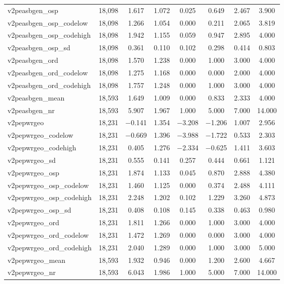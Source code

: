 \begin{table}[!htbp]
\begin{tabular}{@{\extracolsep{5pt}}lccccccc}
v2peasbgen\_osp & 18,098 & 1.617 & 1.072 & 0.025 & 0.649 & 2.467 & 3.900 \\ 
v2peasbgen\_osp\_codelow & 18,098 & 1.266 & 1.054 & 0.000 & 0.211 & 2.065 & 3.819 \\ 
v2peasbgen\_osp\_codehigh & 18,098 & 1.942 & 1.155 & 0.059 & 0.947 & 2.895 & 4.000 \\ 
v2peasbgen\_osp\_sd & 18,098 & 0.361 & 0.110 & 0.102 & 0.298 & 0.414 & 0.803 \\ 
v2peasbgen\_ord & 18,098 & 1.570 & 1.238 & 0.000 & 1.000 & 3.000 & 4.000 \\ 
v2peasbgen\_ord\_codelow & 18,098 & 1.275 & 1.168 & 0.000 & 0.000 & 2.000 & 4.000 \\ 
v2peasbgen\_ord\_codehigh & 18,098 & 1.757 & 1.248 & 0.000 & 1.000 & 3.000 & 4.000 \\ 
v2peasbgen\_mean & 18,593 & 1.649 & 1.009 & 0.000 & 0.833 & 2.333 & 4.000 \\ 
v2peasbgen\_nr & 18,593 & 5.907 & 1.967 & 1.000 & 5.000 & 7.000 & 14.000 \\ 
v2pepwrgeo & 18,231 & $-$0.141 & 1.354 & $-$3.208 & $-$1.206 & 1.007 & 2.956 \\ 
v2pepwrgeo\_codelow & 18,231 & $-$0.669 & 1.396 & $-$3.988 & $-$1.722 & 0.533 & 2.303 \\ 
v2pepwrgeo\_codehigh & 18,231 & 0.405 & 1.276 & $-$2.334 & $-$0.625 & 1.411 & 3.603 \\ 
v2pepwrgeo\_sd & 18,231 & 0.555 & 0.141 & 0.257 & 0.444 & 0.661 & 1.121 \\ 
v2pepwrgeo\_osp & 18,231 & 1.874 & 1.133 & 0.045 & 0.870 & 2.888 & 4.380 \\ 
v2pepwrgeo\_osp\_codelow & 18,231 & 1.460 & 1.125 & 0.000 & 0.374 & 2.488 & 4.111 \\ 
v2pepwrgeo\_osp\_codehigh & 18,231 & 2.248 & 1.202 & 0.102 & 1.229 & 3.260 & 4.873 \\ 
v2pepwrgeo\_osp\_sd & 18,231 & 0.408 & 0.108 & 0.145 & 0.338 & 0.463 & 0.980 \\ 
v2pepwrgeo\_ord & 18,231 & 1.811 & 1.266 & 0.000 & 1.000 & 3.000 & 4.000 \\ 
v2pepwrgeo\_ord\_codelow & 18,231 & 1.472 & 1.269 & 0.000 & 0.000 & 3.000 & 4.000 \\ 
v2pepwrgeo\_ord\_codehigh & 18,231 & 2.040 & 1.289 & 0.000 & 1.000 & 3.000 & 5.000 \\ 
v2pepwrgeo\_mean & 18,593 & 1.932 & 0.946 & 0.000 & 1.200 & 2.600 & 4.667 \\ 
v2pepwrgeo\_nr & 18,593 & 6.043 & 1.986 & 1.000 & 5.000 & 7.000 & 14.000 \\ 

\end{tabular}
\end{table}
